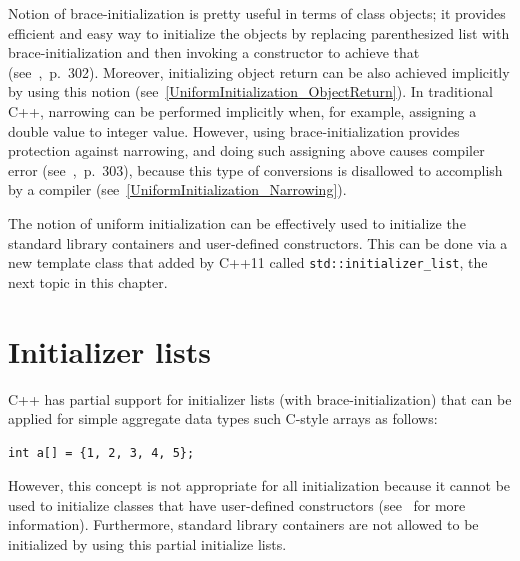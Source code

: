 \documentclass[11pt]{report}
\begin{document}
Notion of brace-initialization is pretty useful in terms of class objects; it provides efficient and easy way to initialize the objects by replacing parenthesized list with brace-initialization and then invoking a constructor to achieve that (see~\cite{Gregorie:professionalcpp},~p.~302). Moreover, initializing object return can be also achieved implicitly by using this notion (see~\ref{UniformInitialization_ObjectReturn}). In traditional C++, narrowing can be performed implicitly when, for example, assigning a double value to integer value. However, using brace-initialization provides protection against narrowing, and doing such assigning above causes compiler error (see~\cite{Gregorie:professionalcpp},~p.~303), because this type of conversions is disallowed to accomplish by a compiler (see~\ref{UniformInitialization_Narrowing}).

The notion of uniform initialization can be effectively used to initialize the standard library containers and user-defined constructors. This can be done via a new template class that added by C++11 called \texttt{std::initializer\_list}, the next topic in this chapter.

\section{Initializer lists}
\label{section: Initializer lists}
C++ has partial support for initializer lists (with brace-initialization) that can be applied for simple aggregate data types such C-style arrays as follows:
\begin{lstlisting}
int a[] = {1, 2, 3, 4, 5};
\end{lstlisting}
However, this concept is not appropriate for all initialization because it cannot be used to initialize classes that have user-defined constructors (see~\cite{Stroustrup:2012:Cpp11} for more information). Furthermore, standard library containers are not allowed to be initialized by using this partial initialize lists.
\end{document}
